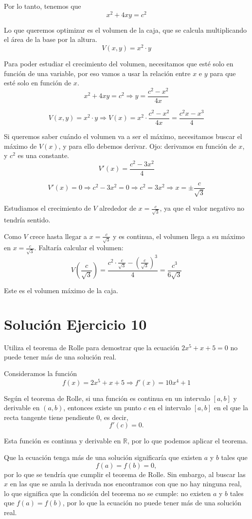 \documentclass[12pt]{article}
\begin{document}
Por lo tanto, tenemos que
\[
x^2+4xy=c^2
\]

Lo que queremos optimizar es el volumen de la caja, que se calcula multiplicando
el área de la base por la altura.
\[
V(x,y)=x^2\cdot y
\]

Para poder estudiar el crecimiento del volumen, necesitamos que esté solo en
función de una variable, por eso vamos a usar la relación entre \(x\) e \(y\) para que
esté solo en función de \(x\).
\[
x^2+4xy=c^2 \Rightarrow y=\frac{c^2-x^2}{4x}
\]

\[
V(x,y)=x^2\cdot y \Rightarrow V(x)=x^2\cdot \frac{c^2-x^2}{4x}
=\frac{c^2x-x^3}{4}
\]

Si queremos saber cuándo el volumen va a ser el máximo, necesitamos buscar
el máximo de \(V(x)\), y para ello debemos derivar. Ojo: derivamos en función de
\(x\), y \(c^2\) es una constante.
\[
V'(x)=\frac{c^2-3x^2}{4}
\]

\[
V'(x)=0 \Rightarrow c^2-3x^2=0 \Rightarrow c^2=3x^2 \Rightarrow x=\pm \frac{c}{\sqrt{3}}
\]

Estudiamos el crecimiento de \(V\) alrededor de \(x=\frac{c}{\sqrt{3}}\), ya que el valor negativo
no tendría sentido.

Como \(V\) crece hasta llegar a \(x=\frac{c}{\sqrt{3}}\) y es continua, el volumen llega a su
máximo en \(x=\frac{c}{\sqrt{3}}\). Faltaría calcular el volumen:
\[
V\left(\frac{c}{\sqrt{3}}\right)
=
\frac{c^2\cdot \frac{c}{\sqrt{3}}-\left(\frac{c}{\sqrt{3}}\right)^3}{4}
=
\frac{c^3}{6\sqrt{3}}
\]

Este es el volumen máximo de la caja.

\section*{Solución Ejercicio 10}
Utiliza el teorema de Rolle para demostrar que la ecuación \(2x^5+x+5=0\) no puede tener más de una solución real.

Consideramos la función
\[
f(x)=2x^5+x+5 \Rightarrow f'(x)=10x^4+1
\]

Según el teorema de Rolle, si una función es continua en un intervalo \([a,b]\) y
derivable en \((a,b)\), entonces existe un punto \(c\) en el intervalo \([a,b]\) en el que la
recta tangente tiene pendiente \(0\), es decir,
\[
f'(c)=0.
\]

Esta función es continua y derivable en \(\mathbb{R}\), por lo que podemos aplicar el teorema.

Que la ecuación tenga más de una solución significaría que existen \(a\) y \(b\) tales que
\[
f(a)=f(b)=0,
\]
por lo que se tendría que cumplir el teorema de Rolle. Sin
embargo, al buscar las \(x\) en las que se anula la derivada nos encontramos con
que no hay ninguna real, lo que significa que la condición del teorema no se
cumple: no existen \(a\) y \(b\) tales que \(f(a)=f(b)\), por lo que la ecuación no puede
tener más de una solución real.
\end{document}
